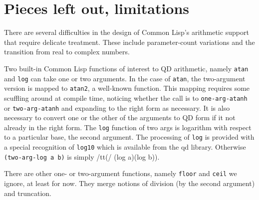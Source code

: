 \documentclass{article}
\begin{document}
\section{Pieces left out, limitations}
There are several difficulties in the design of Common Lisp's arithmetic support 
that require delicate treatment.  These include parameter-count variations and
the transition from real to complex numbers.

Two built-in Common Lisp functions of interest to QD arithmetic, namely {\tt atan}
and {\tt log}  can take one or two arguments.  In the case of {\tt atan}, the
two-argument version is mapped to {\tt atan2}, a well-known function.  This
mapping requires some scuffling around at compile time, noticing whether the
call is to {\tt one-arg-atanh}  or {\tt two-arg-atanh} and expanding to the
right form as necessary.  It is also necessary to convert one or the other
of the arguments to QD form if it not already in the right form.  The {\tt log}
function of two args is logarithm with respect to a particular base, the
second argument. The processing of {\tt log} is provided with a special
recognition of {\tt log10} which is available from the qd library. Otherwise
{\tt (two-arg-log a b)} is simply {/tt(/ (log a)(log b))}.

There are other one- or two-argument functions, namely {\tt floor} and {\tt ceil}
we ignore, at least for now.  They merge notions of division (by the second
argument) and truncation.
\end{document}
